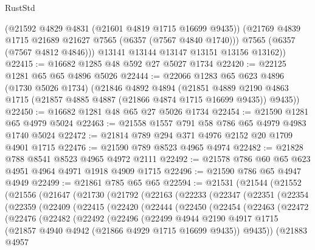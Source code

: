 \begin{lexlean}{RustStd}
\begin{coremodule}
          (@21592 @4829 @4831 (@21601 @4819 @1715 @16699 @9435))
          (@21769 @4839 @1715 @21689 @21627 @7565 (@6357 (@7567 @4840 @1740)))
          @7565
          (@6357 (@7567 @4812 @4846)))
        @13141
        @13144
        @13147
        @13151
        @13156
        @13162))
@22415 := @16682 @1285 @48 @592 @27 @5027 @1734
@22420 := @22125 @1281 @65 @65 @4896 @5026
@22444 := @22066
    @1283
    @65
    @623
    @4896
    (@1730 @5026 @1734)
    (@21846
      @4892
      @4894
      (@21851 @4889 @2190 @4863 @1715 (@21857 @4885 @4887 (@21866 @4874 @1715 @16699 @9435)) @9435))
@22450 := @16682 @1281 @48 @65 @27 @5026 @1734
@22454 := @21590 @1281 @65 @4979 @5024
@22463 := @21558 @1557 @791 @58 @786 @65 @4979 @4983 @1740 @5024
@22472 := @21814 @789 @294 @371 @4976 @2152 @20 @1709 @4901 @1715
@22476 := @21590 @789 @8523 @4965 @4974
@22482 := @21828 @788 @8541 @8523 @4965 @4972 @2111
@22492 := @21578 @786 @60 @65 @623 @4951 @4964 @4971 @1918 @4909 @1715
@22496 := @21590 @786 @65 @4947 @4949
@22499 := @21861 @785 @65 @65
@22594 := @21531
    (@21544
      (@21552
        (@21556
          (@21647
            (@21730
              (@21792
                (@22163
                  (@22233
                    (@22347
                      (@22351
                        (@22354
                          (@22359
                            (@22409
                              (@22415
                                (@22420
                                  (@22444
                                    (@22450
                                      (@22454
                                        (@22463
                                          (@22472
                                            (@22476
                                              (@22482
                                                (@22492
                                                  (@22496
                                                    (@22499
                                                      @4944
                                                      @2190
                                                      @4917
                                                      @1715
                                                      (@21857
                                                        @4940
                                                        @4942
                                                        (@21866 @4929 @1715 @16699 @9435))
                                                      @9435))
                                                  (@21883
                                                    @4957

\end{coremodule}
\end{lexlean}
